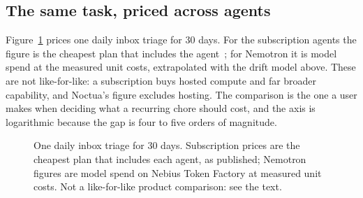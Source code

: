 \documentclass[11pt]{article}
\begin{document}
\subsection{The same task, priced across agents}

Figure~\ref{fig:month} prices one daily inbox triage for 30 days. For the subscription agents the figure is the
cheapest plan that includes the agent~\cite{dots,beam,ayauto}; for Nemotron it is model spend at the measured unit
costs, extrapolated with the drift model above. These are not like-for-like: a subscription buys hosted compute and
far broader capability, and Noctua's figure excludes hosting. The comparison is the one a user makes when deciding
what a recurring chore should cost, and the axis is logarithmic because the gap is four to five orders of magnitude.

\begin{figure}[!htbp]
\centering
{}
\caption{One daily inbox triage for 30 days. Subscription prices are the cheapest plan that includes each agent, as
published; Nemotron figures are model spend on Nebius Token Factory at measured unit costs. Not a like-for-like
product comparison: see the text.}
\label{fig:month}
\end{figure}
\end{document}
